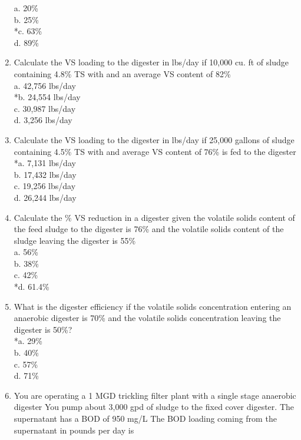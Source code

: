 \documentclass{article}
\begin{document}
\begin{enumerate}
a. 20\% \\
b. 25\% \\
*c. 63\% \\
d. 89\% \\

\item  Calculate the VS loading to the digester in lbs/day if 10,000 cu. ft of sludge containing 4.8\% TS with and an average VS content of 82\% \\

a. 42,756 lbs/day \\
*b. 24,554 lbs/day \\
c. 30,987 lbs/day \\
d. 3,256 lbs/day \\

\item  Calculate the VS loading to the digester in lbs/day if 25,000 gallons of sludge containing 4.5\% TS with and average VS content of 76\% is fed to the digester \\

*a. 7,131 lbs/day \\
b. 17,432 lbs/day \\
c. 19,256 lbs/day \\
d. 26,244 lbs/day \\

\item  Calculate the \% VS reduction in a digester given the volatile solids content of the feed sludge to the digester is 76\% and the volatile solids content of the sludge leaving the digester is 55\% \\

a. 56\% \\
b. 38\% \\
c. 42\% \\
*d. 61.4\% \\

\item  What is the digester efficiency if the volatile solids concentration entering an anaerobic digester is 70\% and the volatile solids concentration leaving the digester is 50\%? \\

*a. 29\% \\
b. 40\% \\
c. 57\% \\
d. 71\% \\

\item  You are operating a 1 MGD trickling filter plant with a single stage anaerobic digester You pump about 3,000 gpd of sludge to the fixed cover digester.  The supernatant has a BOD of 950 mg/L The BOD loading coming from the supernatant in pounds per day is \\


\end{enumerate}
\end{document}
